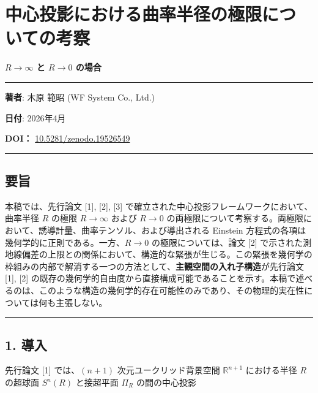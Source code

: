 \documentclass[a4paper,11pt]{ltjsarticle}
\theoremstyle{definition}
\begin{document}
\section{中心投影における曲率半径の極限についての考察}\label{ux4e2dux5fc3ux6295ux5f71ux306bux304aux3051ux308bux66f2ux7387ux534aux5f84ux306eux6975ux9650ux306bux3064ux3044ux3066ux306eux8003ux5bdf}

\textbf{\(R \to \infty\) と \(R \to 0\) の場合}

\begin{center}\rule{0.5\linewidth}{0.5pt}\end{center}

\textbf{著者}: 木原 範昭 (WF System Co., Ltd.)

\textbf{日付}: 2026年4月

\textbf{DOI：} \href{https://doi.org/10.5281/zenodo.19526549}{10.5281/zenodo.19526549}

\begin{center}\rule{0.5\linewidth}{0.5pt}\end{center}

\subsection{要旨}\label{ux8981ux65e8}

本稿では、先行論文 {[}1{]}, {[}2{]}, {[}3{]} で確立された中心投影フレームワークにおいて、曲率半径 \(R\) の極限 \(R \to \infty\) および \(R \to 0\) の両極限について考察する。両極限において、誘導計量、曲率テンソル、および導出される Einstein 方程式の各項は幾何学的に正則である。一方、\(R \to 0\) の極限については、論文 {[}2{]} で示された測地線偏差の上限との関係において、構造的な緊張が生じる。この緊張を幾何学の枠組みの内部で解消する一つの方法として、\textbf{主観空間の入れ子構造}が先行論文 {[}1{]}, {[}2{]} の既存の幾何学的自由度から直接構成可能であることを示す。本稿で述べるのは、このような構造の幾何学的存在可能性のみであり、その物理的実在性については何も主張しない。

\begin{center}\rule{0.5\linewidth}{0.5pt}\end{center}

\subsection{1. 導入}\label{ux5c0eux5165}

先行論文 {[}1{]} では、\((n+1)\) 次元ユークリッド背景空間 \(\mathbb{R}^{n+1}\) における半径 \(R\) の超球面 \(S^n(R)\) と接超平面 \(\Pi_R\) の間の中心投影
\end{document}
